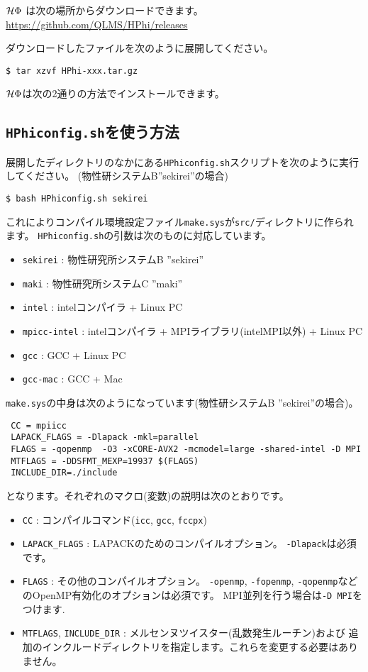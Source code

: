 $\mathcal{H} \Phi$ は次の場所からダウンロードできます。\\
\url{https://github.com/QLMS/HPhi/releases}

ダウンロードしたファイルを次のように展開してください。
\begin{verbatim}
$ tar xzvf HPhi-xxx.tar.gz
\end{verbatim}

$\mathcal{H} \Phi$は次の2通りの方法でインストールできます。

\subsection{\texttt{HPhiconfig.sh}を使う方法}

展開したディレクトリのなかにある\verb|HPhiconfig.sh|スクリプトを次のように実行してください。
(物性研システムB''sekirei''の場合)
\begin{verbatim}
$ bash HPhiconfig.sh sekirei
\end{verbatim}
これによりコンパイル環境設定ファイル\verb|make.sys|が\verb|src/|ディレクトリに作られます。
\verb|HPhiconfig.sh|の引数は次のものに対応しています。
\begin{itemize}
\item \verb|sekirei| : 物性研究所システムB ''sekirei''
\item \verb|maki| : 物性研究所システムC ''maki''
\item \verb|intel| : intelコンパイラ + Linux PC
\item \verb|mpicc-intel| : intelコンパイラ + MPIライブラリ(intelMPI以外) + Linux PC
\item \verb|gcc| : GCC + Linux PC
\item \verb|gcc-mac| : GCC + Mac
\end{itemize}

\verb|make.sys|の中身は次のようになっています(物性研システムB ''sekirei''の場合)。
\begin{verbatim}
 CC = mpiicc
 LAPACK_FLAGS = -Dlapack -mkl=parallel 
 FLAGS = -qopenmp  -O3 -xCORE-AVX2 -mcmodel=large -shared-intel -D MPI
 MTFLAGS = -DDSFMT_MEXP=19937 $(FLAGS)
 INCLUDE_DIR=./include
\end{verbatim}
となります。それぞれのマクロ(変数)の説明は次のとおりです。
\begin{itemize}
\item \verb|CC| : コンパイルコマンド(\verb|icc|, \verb|gcc|, \verb|fccpx|)
\item \verb|LAPACK_FLAGS| : LAPACKのためのコンパイルオプション。 \verb|-Dlapack|は必須です。
\item \verb|FLAGS| : その他のコンパイルオプション。
  \verb|-openmp|, \verb|-fopenmp|, \verb|-qopenmp|などのOpenMP有効化のオプションは必須です。
  MPI並列を行う場合は\verb|-D MPI|をつけます. 
\item \verb|MTFLAGS|, \verb|INCLUDE_DIR| : メルセンヌツイスター(乱数発生ルーチン)および
  追加のインクルードディレクトリを指定します。これらを変更する必要はありません。
\end{itemize}

